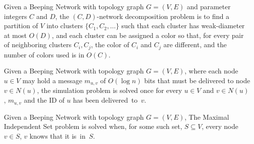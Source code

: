 Given a Beeping Network with topology graph $G=(V,E)$ and parameter integers $C$ and $D$,
the $(C,D)$-network decomposition problem is to find a partition of $V$ into clusters $\{C_1,C_2,\dots\}$ such that each cluster has weak-diameter at most $O(D)$, and each cluster can be assigned a color so that, 
for every pair of neighboring clusters $C_i,C_j$, 
the color of $C_i$ and $C_j$ are different,
and the number of colors used is in $O(C)$.

Given a Beeping Network with topology graph $G=(V,E)$, where each node $u\in V$ may hold a message $m_{u,v}$ of $O(\log n)$ bits that must be delivered to node $v\in N(u)$, the \congest simulation problem is solved once for every $u\in V$ and $v\in N(u)$, 
$m_{u,v}$ and the ID of $u$ has been delivered~to~$v$.

Given a Beeping Network with topology graph $G=(V,E)$, 
The Maximal Independent Set problem is solved when, for some such set,
 $S\subseteq V$, every node $v\in S$, $v$  knows that it is~in~$S$.



